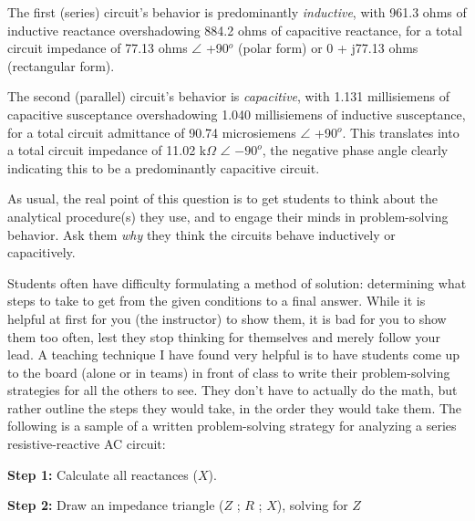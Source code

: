 





The first (series) circuit's behavior is predominantly {\it inductive}, with 961.3 ohms of inductive reactance overshadowing 884.2 ohms of capacitive reactance, for a total circuit impedance of 77.13 ohms $\angle$ +90$^{o}$ (polar form) or 0 + j77.13 ohms (rectangular form).  

\vskip 10pt

The second (parallel) circuit's behavior is {\it capacitive}, with 1.131 millisiemens of capacitive susceptance overshadowing 1.040 millisiemens of inductive susceptance, for a total circuit admittance of 90.74 microsiemens $\angle$ +90$^{o}$.  This translates into a total circuit impedance of 11.02 k$\Omega$ $\angle$ $-90^{o}$, the negative phase angle clearly indicating this to be a predominantly capacitive circuit.







As usual, the real point of this question is to get students to think about the analytical procedure(s) they use, and to engage their minds in problem-solving behavior.  Ask them {\it why} they think the circuits behave inductively or capacitively.

\vskip 10pt

Students often have difficulty formulating a method of solution: determining what steps to take to get from the given conditions to a final answer.  While it is helpful at first for you (the instructor) to show them, it is bad for you to show them too often, lest they stop thinking for themselves and merely follow your lead.  A teaching technique I have found very helpful is to have students come up to the board (alone or in teams) in front of class to write their problem-solving strategies for all the others to see.  They don't have to actually do the math, but rather outline the steps they would take, in the order they would take them.  The following is a sample of a written problem-solving strategy for analyzing a series resistive-reactive AC circuit:

\vskip 10pt

\goodbreak

{\bf Step 1:} Calculate all reactances ($X$).

{\bf Step 2:} Draw an impedance triangle ($Z$ ; $R$ ; $X$), solving for $Z$

